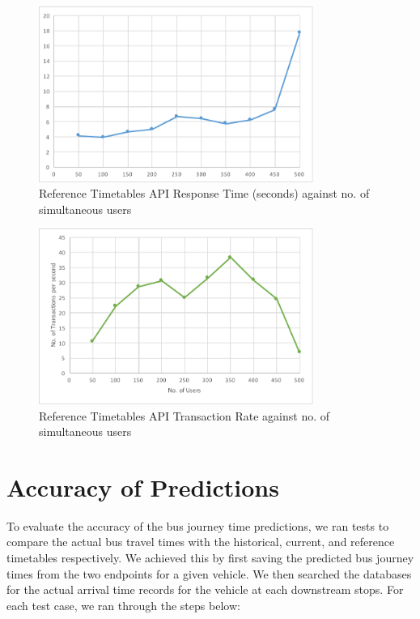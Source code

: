 \begin{figure}
\centering
\includegraphics[width=0.8\textwidth]{figures/siege_tfl_response_time_against_users.pdf}
\caption{\label{fig:siege_tfl_api_response_time} Reference Timetables API Response Time (seconds) against no. of simultaneous users}
\end{figure}

\begin{figure}
\centering
\includegraphics[width=0.8\textwidth]{figures/siege_tfl_transfer_rate_against_users.pdf}
\caption{\label{fig:siege_tfl_api_transfer_rate} Reference Timetables API Transaction Rate against no. of simultaneous users}
\end{figure}

\section{Accuracy of Predictions}
\label{sec:prediction_accuracy}
\par To evaluate the accuracy of the bus journey time predictions, we ran tests to compare the actual bus travel times with the historical, current, and reference timetables respectively. We achieved this by first saving the predicted bus journey times from the two endpoints for a given vehicle. We then searched the databases for the actual arrival time records for the vehicle at each downstream stops. For each test case, we ran through the steps below:

